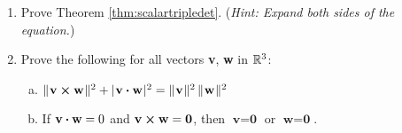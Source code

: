 \begin{enumerate}[\bfseries 1.]
 \item Prove Theorem \ref{thm:scalartripledet}. (\emph{Hint: Expand both sides of the equation.})
 \item Prove the following for all vectors \textbf{v}, \textbf{w} in $\mathbb{R}^{3}$:
  \begin{enumerate}[(a)]
   \item $\lVert\mspace{1mu}\textbf{v} \bm{\times} \textbf{w}\mspace{1mu}\rVert^2 + \lvert\mspace{1mu}\textbf{v} \bm{\cdot} \textbf{w}\mspace{1mu}\rvert^2 =
    \lVert\mspace{1mu}\textbf{v}\mspace{1mu}\rVert^2 \, \lVert\mspace{1mu}\textbf{w}\mspace{1mu}\rVert^2$
   \item If $\textbf{v} \bm{\cdot} \textbf{w} = 0$ and $\textbf{v} \bm{\times} \textbf{w} = \textbf{0}$, then
    $\textbf{v} = \textbf{0}$ or $\textbf{w} = \textbf{0}$.
  \end{enumerate}


\end{enumerate}
